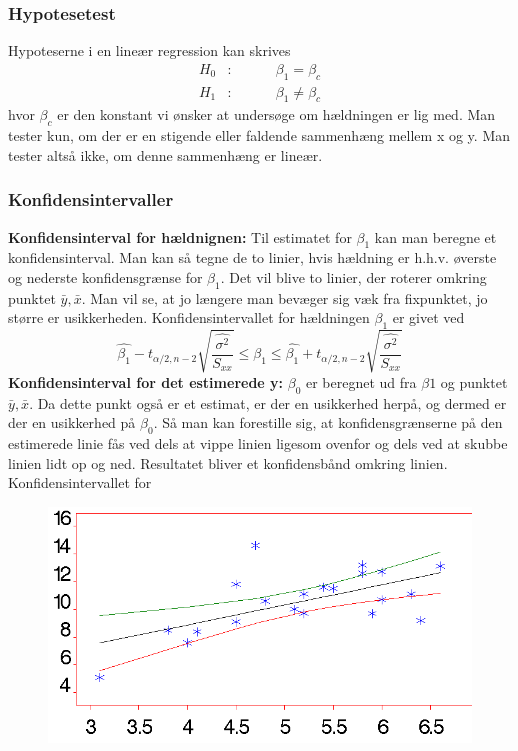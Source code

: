 \documentclass[11pt]{article}
\begin{document}
\subsubsection{Hypotesetest}
Hypoteserne i en lineær regression kan skrives
\begin{eqnarray*}
H_0&:&\hspace{1cm}\beta_1 = \beta_c\\
H_1&:&\hspace{1cm}\beta_1 \neq \beta_c
\end{eqnarray*}
hvor $\beta_c$ er den konstant vi ønsker at undersøge om hældningen er lig med. Man tester kun, om der er en stigende eller faldende sammenhæng mellem x og y. Man tester altså ikke, om denne sammenhæng er lineær.
\subsubsection{Konfidensintervaller}
\textbf{Konfidensinterval for hældnignen:} Til estimatet for $\beta_1$ kan man beregne et konfidensinterval. Man kan så tegne de to linier, hvis hældning er h.h.v. øverste og nederste konfidensgrænse for $\beta_1$. Det vil blive to linier, der roterer omkring punktet $\bar{y},\bar{x}$. Man vil se, at jo længere man bevæger sig væk fra fixpunktet, jo større er usikkerheden. Konfidensintervallet for hældningen $\beta_1$ er givet ved
$$\hat{\beta_1}-t_{\alpha/2,n-2}\sqrt{\frac{\hat{\sigma^2}}{S_{xx}}}\leq \beta_1\leq\hat{\beta_1}+t_{\alpha/2,n-2}\sqrt{\frac{\hat{\sigma^2}}{S_{xx}}}$$
\textbf{Konfidensinterval for det estimerede y:} $\beta_0$ er beregnet ud fra $\beta1$ og punktet $\bar{y},\bar{x}$. Da dette punkt også er et estimat, er der en usikkerhed herpå, og dermed er der en usikkerhed på $\beta_0$. Så man kan forestille sig, at konfidensgrænserne på den estimerede linie fås ved dels at vippe linien ligesom ovenfor og dels ved at skubbe linien lidt op og ned. Resultatet bliver et konfidensbånd omkring linien. Konfidensintervallet for 
 
\begin{figure}[H]
\centering
\includegraphics[scale=0.5]{img/Selection_017}
\end{figure}
\end{document}
